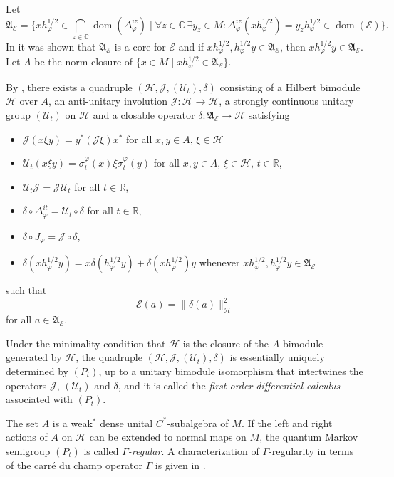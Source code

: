 \documentclass[12pt,a4paper]{amsart}
\newcommand{\1}{\mathds{1}}
\renewcommand{\phi}{\varphi}
\newcommand{\E}{\mathcal E}
\renewcommand{\H}{\mathcal H}
\newcommand{\J}{\mathcal J}
\newcommand{\U}{\mathcal U}
\newcommand{\IC}{\mathbb C}
\newcommand{\IR}{\mathbb R}
\newcommand{\dom}{\operatorname{dom}}
\newcommand{\norm}[1]{\lVert#1\rVert}
\theoremstyle{plain}
\theoremstyle{definition}
\theoremstyle{remark}
\begin{document}
Let
\begin{equation*}
    \mathfrak A_\E=\{xh_\phi^{1/2}\in \bigcap_{z\in \IC}\dom(\Delta_\phi^{iz})\mid \forall z\in\IC\,\exists y_z\in M\colon \Delta_\phi^{iz}(x h_\phi^{1/2})=y_z h_\phi^{1/2}\in\dom(\E)\}.
\end{equation*}
In \cite[Theorem 6.3]{Wir22b} it was shown that $\mathfrak A_\E$ is a core for $\E$ and if $xh_\phi^{1/2},h_\phi^{1/2}y\in \mathfrak A_\E$, then $xh_\phi^{1/2}y\in \mathfrak A_\E$. Let $A$ be the norm closure of $\{x\in M\mid xh_\phi^{1/2}\in \mathfrak A_\E\}$.

By \cite[Theorem 6.8]{Wir22b}, there exists a quadruple $(\H,\J,(\U_t),\delta)$ consisting of a Hilbert bimodule $\H$ over $A$, an anti-unitary involution $\J\colon \H\to\H$, a strongly continuous unitary group $(\U_t)$ on $\H$ and a closable operator $\delta\colon\mathfrak A_\E\to \H$ satisfying
\begin{itemize}
    \item $\J(x\xi y)=y^\ast (\J\xi)x^\ast$ for all $x,y\in A$, $\xi\in \H$
    \item $\U_t(x\xi y)=\sigma^\phi_t(x)\xi\sigma^\phi_t(y)$ for all $x,y\in A$, $\xi\in \H$, $t\in\IR$,
    \item $\U_t\J=\J\U_t$ for all $t\in\IR$,
    \item $\delta\circ\Delta_\phi^{it}=\U_t\circ\delta$ for all $t\in\IR$,
    \item $\delta\circ J_\phi=\J\circ\delta$,
    \item $\delta(xh_\phi^{1/2}y)=x\delta(h_\phi^{1/2}y)+\delta(xh_\phi^{1/2})y$ whenever $xh_\phi^{1/2},h_\phi^{1/2}y\in \mathfrak A_\E$
\end{itemize}
such that
\begin{equation*}
    \E(a)=\norm{\delta(a)}_\H^2
\end{equation*}
for all $a\in \mathfrak A_\E$.

Under the minimality condition that $\H$ is the closure of the $A$-bimodule generated by $\H$, the quadruple $(\H,\J,(\U_t),\delta)$ is essentially uniquely determined by $(P_t)$, up to a unitary bimodule isomorphism that intertwines the operators $\J$, $(\U_t)$ and $\delta$, and it is called the \emph{first-order differential calculus} associated with $(P_t)$.

The set $A$ is a weak$^\ast$ dense unital $C^\ast$-subalgebra of $M$. If the left and right actions of $A$ on $\H$ can be extended to normal maps on $M$, the quantum Markov semigroup $(P_t)$ is called \emph{$\Gamma$-regular}. A characterization of $\Gamma$-regularity in terms of the carré du champ operator $\Gamma$ is given in \cite[Theorem 7.2]{Wir22b}.
\end{document}
